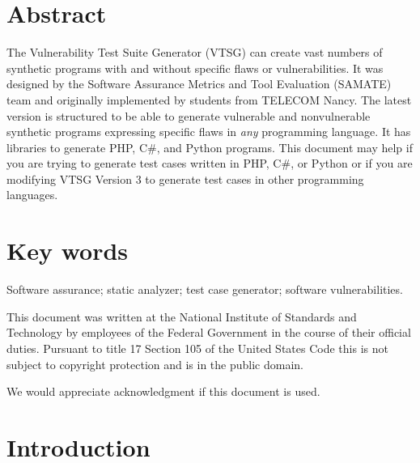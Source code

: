 \documentclass[12pt]{article}
\newcommand{\CSharp}{C{\fontseries{b}\selectfont\#}}
\begin{document}
\section*{Abstract}
\normalsize
The Vulnerability Test Suite Generator (VTSG) can create vast numbers of
synthetic programs with and without specific flaws or vulnerabilities.
It was designed by the Software Assurance Metrics and Tool Evaluation (SAMATE) team
and originally implemented by students from TELECOM Nancy.
The latest version is structured to be able to generate vulnerable and nonvulnerable
synthetic programs expressing specific flaws in \emph{any} programming language.
It has libraries to generate PHP, \CSharp, and Python programs.
This document may help if you are trying to generate test cases written in 
PHP, \CSharp, or Python or if you are modifying VTSG Version 3 to generate test 
cases in other programming languages.

\section*{Key words}
\normalsize Software assurance; static analyzer; test case generator; 
software vulnerabilities.

\vfill

This document was written at the National Institute of Standards and
Technology by employees of the Federal Government in the course of
their official duties.  Pursuant to title 17 Section 105 of the United
States Code this is not subject to copyright protection and
is in the public domain.


We would appreciate acknowledgment if this document is used.

\pagebreak
\begin{center}
\tableofcontents
\end{center}
\pagebreak

\newpage

\section{Introduction}
\end{document}
